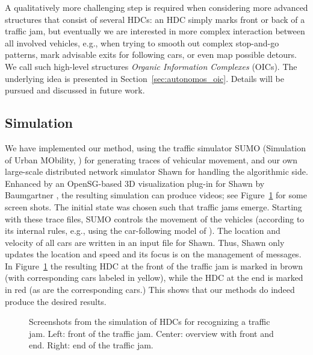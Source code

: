 \documentclass{acmrip}
\newcommand{\secref}[1]{Section~\ref{sec:#1}}
\begin{document}
A qualitatively more challenging step is required when considering
more advanced structures that consist of several HDCs: an HDC simply
marks front or back of a traffic jam, but eventually we are
interested in more complex interaction between all involved
vehicles, e.g., when trying to smooth out complex stop-and-go
patterns, mark advisable exits for following cars, or even map
possible detours. We call such high-level structures {\em Organic
Information Complexes} (OICs). The underlying idea is presented in
\secref{autonomos_oic}. Details will be pursued and discussed in
future work.






\subsection{Simulation}

We have implemented our method, using the traffic simulator SUMO
(Simulation of Urban MObility, \cite{Krajzewicz_et_al2002_1}) for
generating traces of vehicular movement, and our own large-scale
distributed network simulator Shawn \cite{kpbff-snaswsn-05} for
handling the algorithmic side. Enhanced by an OpenSG-based 3D
visualization plug-in for Shawn by Baumgartner
\cite{b-reafp-06}, the resulting simulation can produce
videos; see Figure~\ref{isola} for some screen
shots. The initial state was chosen such that traffic jams emerge.
Starting with these trace files, SUMO controls the movement of the
vehicles (according to its internal rules, e.g., using the
car-following model of \cite{k-mmtfi-97}). The location and velocity
of all cars are written in an input file for Shawn. Thus,
Shawn only updates the location and speed and its focus is on the
management of messages. In Figure~\ref{isola} the resulting HDC at
the front of the traffic jam is marked in brown (with corresponding
cars labeled in yellow), while the HDC at the end is marked in red
(as are the corresponding cars.) This shows that
our methods do indeed produce the desired results.

\begin{figure}[tp]
\centering {}\hfill {} \hfill {} \caption{\label{isola}\small Screenshots from the
simulation of HDCs for recognizing a traffic jam. Left: front of
the traffic jam. Center: overview with front and end. Right: end
of the traffic jam. }
\end{figure}
\end{document}
